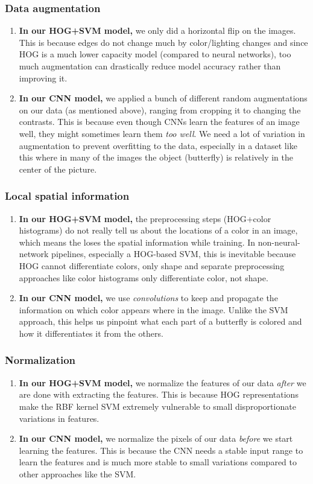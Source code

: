 \documentclass[10pt]{article} %
\begin{document}
\subsubsection{Data augmentation}\begin{enumerate}
    \item \textbf{In our HOG+SVM model,} we only did a horizontal flip on the images. This is because edges do not change much by color/lighting changes and since HOG is a much lower capacity model (compared to neural networks), too much augmentation can drastically reduce model accuracy rather than improving it.
    \item \textbf{In our CNN model,} we applied a bunch of different random augmentations on our data (as mentioned above), ranging from cropping it to changing the contrasts. This is because even though CNNs learn the features of an image well, they might sometimes learn them \textit{too well}. We need a lot of variation in augmentation to prevent overfitting to the data, especially in a dataset like this where in many of the images the object (butterfly) is relatively in the center of the picture.
\end{enumerate}
\subsubsection{Local spatial information}\begin{enumerate}
    \item \textbf{In our HOG+SVM model,} the preprocessing steps (HOG+color histograms) do not really tell us about the locations of a color in an image, which means the loses the spatial information while training. In non-neural-network pipelines, especially a HOG-based SVM, this is inevitable because HOG cannot differentiate colors, only shape and separate preprocessing approaches like color histograms only differentiate color, not shape.
    \item \textbf{In our CNN model,} we use \textit{convolutions} to keep and propagate the information on which color appears where in the image. Unlike the SVM approach, this helps us pinpoint what each part of a butterfly is colored and how it differentiates it from the others.
\end{enumerate}
\subsubsection{Normalization}\begin{enumerate}
    \item \textbf{In our HOG+SVM model,} we normalize the features of our data \textit{after} we are done with extracting the features. This is because HOG representations make the RBF kernel SVM extremely vulnerable to small disproportionate variations in features.
    \item \textbf{In our CNN model,} we normalize the pixels of our data \textit{before} we start learning the features. This is because the CNN needs a stable input range to learn the features and is much more stable to small variations compared to other approaches like the SVM.
\end{enumerate}
\end{document}
